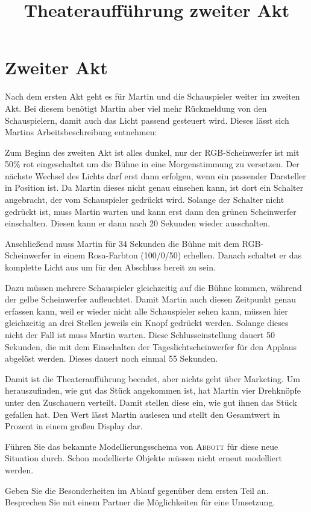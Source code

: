 \documentclass[11pt, a4paper]{scrartcl}
\title{Theateraufführung zweiter Akt}
\begin{document}
\section*{Zweiter Akt}

Nach dem ersten Akt geht es für Martin und die Schauspieler weiter im zweiten Akt. Bei diesem benötigt Martin aber viel mehr Rückmeldung von den Schauspielern, damit auch das Licht passend gesteuert wird. Dieses lässt sich Martins Arbeitsbeschreibung entnehmen:

\begin{mdframed}
    Zum Beginn des zweiten Akt ist alles dunkel, nur der RGB-Scheinwerfer ist mit 50\% rot eingeschaltet um die Bühne in eine Morgenstimmung zu versetzen. Der nächste Wechsel des Lichts darf erst dann erfolgen, wenn ein passender Darsteller in Position ist. Da Martin dieses nicht genau einsehen kann, ist dort ein Schalter angebracht, der vom Schauspieler gedrückt wird. Solange der Schalter nicht gedrückt ist, muss Martin warten und kann erst dann den grünen Scheinwerfer einschalten. Diesen kann er dann nach 20 Sekunden wieder ausschalten.

    Anschließend muss Martin für 34 Sekunden die Bühne mit dem RGB-Scheinwerfer in einem Rosa-Farbton (100/0/50) erhellen. Danach schaltet er das komplette Licht aus um für den Abschluss bereit zu sein.

    Dazu müssen mehrere Schauspieler gleichzeitig auf die Bühne kommen, während der gelbe Scheinwerfer aufleuchtet. Damit Martin auch diesen Zeitpunkt genau erfassen kann, weil er wieder nicht alle Schauspieler sehen kann, müssen hier gleichzeitig an drei Stellen jeweils ein Knopf gedrückt werden. Solange dieses nicht der Fall ist muss Martin warten. Diese Schlusseinstellung dauert 50 Sekunden, die mit dem Einschalten der Tageslichtscheinwerfer für den Applaus abgelöst werden. Dieses dauert noch einmal 55 Sekunden.

    Damit ist die Theateraufführung beendet, aber nichts geht über Marketing. Um herauszufinden, wie gut das Stück angekommen ist, hat Martin vier Drehknöpfe unter den Zuschauern verteilt. Damit stellen diese ein, wie gut ihnen das Stück gefallen hat. Den Wert lässt Martin auslesen und stellt den Gesamtwert in Prozent in einem großen Display dar.
\end{mdframed}

\begin{aufgabe}
    Führen Sie das bekannte Modellierungsschema von \textsc{Abbott} für diese neue Situation durch. Schon modellierte Objekte müssen nicht erneut modelliert werden.
\end{aufgabe}

\begin{aufgabe}
    Geben Sie die Besonderheiten im Ablauf gegenüber dem ersten Teil an. Besprechen Sie mit einem Partner die Möglichkeiten für eine Umsetzung.
\end{aufgabe}
\end{document}
